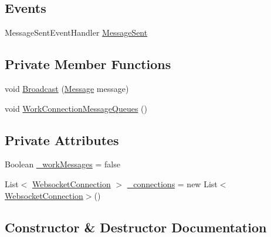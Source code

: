 \subsection*{Events}
\begin{DoxyCompactItemize}
\item 
Message\+Sent\+Event\+Handler \hyperlink{class_web_analyzer_1_1_server_1_1_connection_manager_a2eb5de18882e69a65b4b7ce3ee458af1}{Message\+Sent}
\end{DoxyCompactItemize}
\subsection*{Private Member Functions}
\begin{DoxyCompactItemize}
\item 
void \hyperlink{class_web_analyzer_1_1_server_1_1_connection_manager_a802503ffd29cf9a18a2bfae95adc4b4e}{Broadcast} (\hyperlink{class_web_analyzer_1_1_models_1_1_message_model_1_1_message}{Message} message)
\item 
void \hyperlink{class_web_analyzer_1_1_server_1_1_connection_manager_a773422b69490cf64139d8237a9122eaa}{Work\+Connection\+Message\+Queues} ()
\end{DoxyCompactItemize}
\subsection*{Private Attributes}
\begin{DoxyCompactItemize}
\item 
Boolean \hyperlink{class_web_analyzer_1_1_server_1_1_connection_manager_a23a1f3a046b14bcb1333c3ef846015d6}{\+\_\+work\+Messages} = false
\item 
List$<$ \hyperlink{class_web_analyzer_1_1_server_1_1_websocket_connection}{Websocket\+Connection} $>$ \hyperlink{class_web_analyzer_1_1_server_1_1_connection_manager_a4d1d80f0e1bca824c36908efcc4f9dc0}{\+\_\+connections} = new List$<$\hyperlink{class_web_analyzer_1_1_server_1_1_websocket_connection}{Websocket\+Connection}$>$()
\end{DoxyCompactItemize}


\subsection{Constructor \& Destructor Documentation}
\hypertarget{class_web_analyzer_1_1_server_1_1_connection_manager_ae034fe5148cccbcc759a56abd68bb51a}{}
